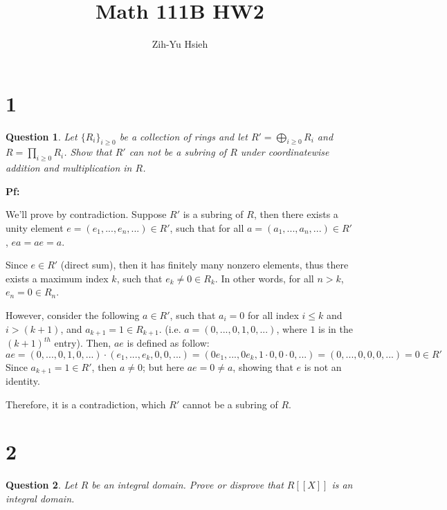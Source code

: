 \documentclass{article}
\title{Math 111B HW2}
\author{Zih-Yu Hsieh}
\newtheorem{question}{Question}
\begin{document}
\maketitle

\section*{1}
\begin{myBox}[]{}
    \begin{question}
        Let $\{R_i\}_{i\geq 0}$ be a collection of rings and let $R' = \bigoplus_{i\geq 0} R_i$ and $R = \prod_{i\geq 0} R_i$. Show
        that $R'$ can not be a subring of $R$ under coordinatewise addition and multiplication in $R$.
    \end{question}
\end{myBox}

\textbf{Pf:}

We'll prove by contradiction. Suppose $R'$ is a subring of $R$, then there exists a unity element $e = (e_1,...,e_n,...)\in R'$, 
such that for all $a = (a_1,...,a_n,...)\in R'$, $ea = ae = a$.

Since $e\in R'$ (direct sum), then it has finitely many nonzero elements, thus there exists a maximum index $k$, such that $e_k \neq 0 \in R_k$.
In other words, for all $n>k$, $e_n = 0\in R_n$. 

\hfill

However, consider the following $a\in R'$, such that $a_i=0$ for all index $i\leq k$ and $i>(k+1)$, and $a_{k+1}=1\in R_{k+1}$. 
(i.e. $a=(0,...,0,1,0,...)$, where $1$ is in the $(k+1)^{th}$ entry).
Then, $ae$ is defined as follow:
$$ae = (0,...,0,1,0,...)\cdot (e_1,...,e_k,0,0,...) = (0e_1,...,0e_k,1\cdot 0,0\cdot0,...) = (0,...,0,0,0,...) = 0\in R'$$
Since $a_{k+1}=1\in R'$, then $a\neq 0$; but here $ae = 0 \neq a$, showing that $e$ is not an identity.

Therefore, it is a contradiction, which $R'$ cannot be a subring of $R$.

\hfill

\hfill

\section*{2}
\begin{myBox}[]{}
    \begin{question}
        Let $R$ be an integral domain. Prove or disprove that $R[[X]]$ is an integral domain.
    \end{question}
\end{myBox}
\end{document}
